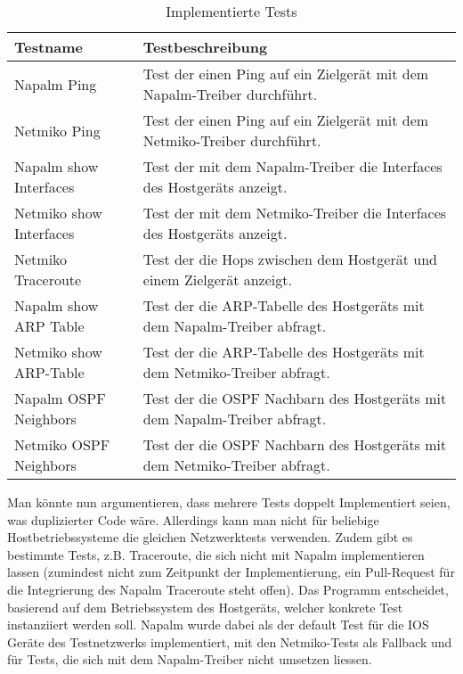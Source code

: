 \documentclass[]{subfiles}
\begin{document}
\begin{table}[h!]
    \begin{tabularx}{\textwidth}{lX}
        \toprule
        Testname & Testbeschreibung \\
        \midrule
        Napalm Ping & Test der einen Ping auf ein Zielgerät mit dem Napalm-Treiber durchführt.\\
        Netmiko Ping & Test der einen Ping auf ein Zielgerät mit dem Netmiko-Treiber durchführt. \\
        Napalm show Interfaces & Test der mit dem Napalm-Treiber die Interfaces des Hostgeräts anzeigt.\\
        Netmiko show Interfaces & Test der mit dem Netmiko-Treiber die Interfaces des Hostgeräts anzeigt.\\
        Netmiko Traceroute & Test der die Hops zwischen dem Hostgerät und einem Zielgerät anzeigt.\\
        Napalm show ARP Table & Test der die ARP-Tabelle des Hostgeräts mit dem Napalm-Treiber abfragt. \\
        Netmiko show ARP-Table & Test der die ARP-Tabelle des Hostgeräts mit dem Netmiko-Treiber abfragt. \\
        Napalm OSPF Neighbors & Test der die OSPF Nachbarn des Hostgeräts mit dem Napalm-Treiber abfragt. \\
        Netmiko OSPF Neighbors & Test der die OSPF Nachbarn des Hostgeräts mit dem Netmiko-Treiber abfragt. \\
        \bottomrule
    \end{tabularx}
    \caption{Implementierte Tests}
\end{table}


Man könnte nun argumentieren, dass mehrere Tests doppelt Implementiert seien, was duplizierter Code wäre.
Allerdings kann man nicht für beliebige Hostbetriebssysteme die gleichen Netzwerktests verwenden.
Zudem gibt es bestimmte Tests, z.B. Traceroute, die sich nicht mit Napalm implementieren lassen
(zumindest nicht zum Zeitpunkt der Implementierung, ein Pull-Request für die Integrierung des 
Napalm Traceroute steht offen).
Das Programm entscheidet, basierend auf dem Betriebssystem des Hostgeräts, welcher 
konkrete Test instanziiert werden soll. 
Napalm wurde dabei als der default Test für die IOS Geräte des Testnetzwerks implementiert,
mit den Netmiko-Tests als Fallback und für Tests, die sich mit dem Napalm-Treiber nicht umsetzen liessen.
\end{document}

